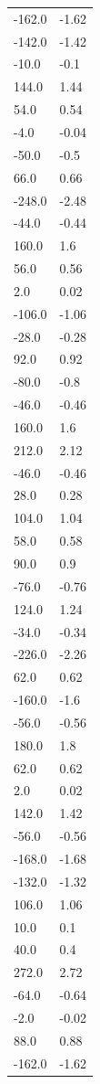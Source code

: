 \begin{longtable}{ll}
-162.0 & -1.62 \\
-142.0 & -1.42 \\
-10.0 & -0.1 \\
144.0 & 1.44 \\
54.0 & 0.54 \\
-4.0 & -0.04 \\
-50.0 & -0.5 \\
66.0 & 0.66 \\
-248.0 & -2.48 \\
-44.0 & -0.44 \\
160.0 & 1.6 \\
56.0 & 0.56 \\
2.0 & 0.02 \\
-106.0 & -1.06 \\
-28.0 & -0.28 \\
92.0 & 0.92 \\
-80.0 & -0.8 \\
-46.0 & -0.46 \\
160.0 & 1.6 \\
212.0 & 2.12 \\
-46.0 & -0.46 \\
28.0 & 0.28 \\
104.0 & 1.04 \\
58.0 & 0.58 \\
90.0 & 0.9 \\
-76.0 & -0.76 \\
124.0 & 1.24 \\
-34.0 & -0.34 \\
-226.0 & -2.26 \\
62.0 & 0.62 \\
-160.0 & -1.6 \\
-56.0 & -0.56 \\
180.0 & 1.8 \\
62.0 & 0.62 \\
2.0 & 0.02 \\
142.0 & 1.42 \\
-56.0 & -0.56 \\
-168.0 & -1.68 \\
-132.0 & -1.32 \\
106.0 & 1.06 \\
10.0 & 0.1 \\
40.0 & 0.4 \\
272.0 & 2.72 \\
-64.0 & -0.64 \\
-2.0 & -0.02 \\
88.0 & 0.88 \\
-162.0 & -1.62 \\

\end{longtable}
